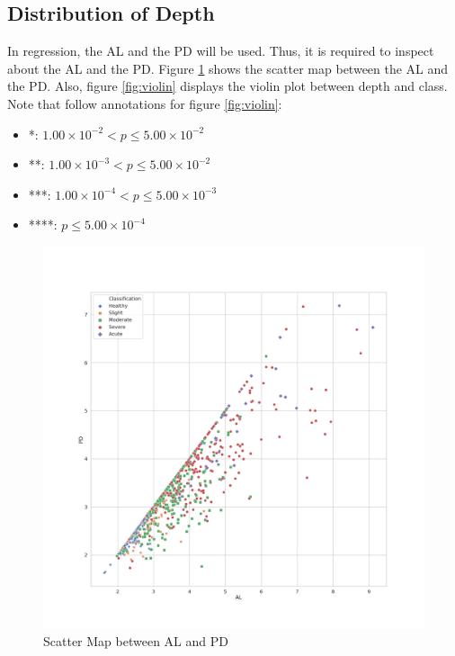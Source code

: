 \documentclass[11pt, a4paper]{article}
\begin{document}
    	\subsection{Distribution of Depth}
			In regression, the AL and the PD will be used. Thus, it is required to inspect about the AL and the PD. Figure \ref{fig:scatter} shows the scatter map between the AL and the PD. Also, figure \ref{fig:violin} displays the violin plot between depth and class. Note that follow annotations for figure \ref{fig:violin}:
			\begin{itemize}
				\item *: $1.00 \times 10^{-2} < p \leq 5.00 \times 10^{-2}$
				\item **: $1.00 \times 10^{-3} < p \leq 5.00 \times 10^{-2}$
				\item ***: $1.00 \times 10^{-4} < p \leq 5.00 \times 10^{-3}$
				\item ****: $p \leq 5.00 \times 10^{-4}$
			\end{itemize}
    		
    		\begin{figure}[htbp]
				\centering
				\includegraphics[width=0.5 \linewidth]{figures/scatter.png}
				\caption{Scatter Map between AL and PD}
				\label{fig:scatter}
    		\end{figure}
    	
\end{document}

